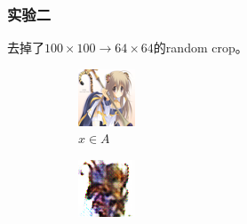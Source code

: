 \documentclass{beamer}
\begin{document}
\begin{frame}
\frametitle{实验二}
去掉了$100 \times 100 \to 64 \times 64$的random crop。
\begin{figure}[htb]
    \centering
    \begin{subfigure}[b]{0.23\linewidth}
        \includegraphics[width=\linewidth]{exp2_epoch004_real_A.png}
        \caption{$x \in A$}
      \end{subfigure}
      \begin{subfigure}[b]{0.23\linewidth}
        \includegraphics[width=\linewidth]{exp2_epoch004_fake_B.png}

\end{subfigure}
\end{figure}
\end{frame}
\end{document}
